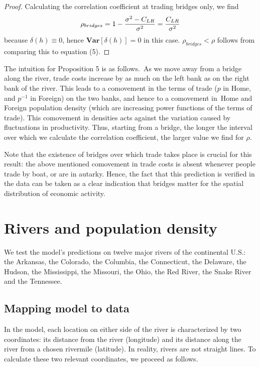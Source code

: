 \documentclass[12pt]{article}
\newcommand{\Var}{\mathbf{Var}}
\begin{document}
\begin{proof}
Calculating the correlation coefficient at trading bridges only, we find%
\[
\rho _{bridges}=1-\frac{\sigma ^{2}-C_{LR}}{\sigma ^{2}}=\frac{C_{LR}}{%
\sigma ^{2}}
\]%
because $\delta \left( h\right) \equiv 0$, hence $\Var\left[ \delta \left(
h\right) \right] =0$ in this case. $\rho _{bridges}<\rho $ follows from
comparing this to equation (5).
\end{proof}

The intuition for Proposition 5 is as follows.\ As we move away from a
bridge along the river, trade costs increase by as much on the left bank as
on the right bank of the river. This leads to a comovement in the terms of
trade ($p$ in Home, and $p^{-1}$ in Foreign) on the two banks, and
hence to a comovement in\ Home and Foreign population density (which are
increasing power functions of the terms of trade). This comovement in
densities acts against the variation caused by fluctuations in productivity.
Thus, starting from a bridge, the longer the interval over which we
calculate the correlation coefficient, the larger value we find for $\rho $.

Note that the existence of bridges over which trade takes place is crucial
for this result: the above mentioned comovement in trade costs is absent
whenever people trade by boat, or are in autarky. Hence, the fact that this
prediction is verified in the data can be taken as a clear indication that
bridges matter for the spatial distribution of economic activity.

\section{Rivers and population density}

We test the model's predictions on twelve major rivers of the continental U.S.: the Arkansas, the Colorado, the Columbia, the Connecticut, the Delaware, the Hudson, the Mississippi, the Missouri, the Ohio, the Red River, the Snake River and the Tennessee.

\subsection{Mapping model to data}

In the model, each location on either side of the river is characterized by two coordinates: its
distance from the river (longitude) and its distance along the river from a
chosen rivermile (latitude). In
reality, rivers are not straight lines. To calculate these two relevant
coordinates, we proceed as follows.
\end{document}
